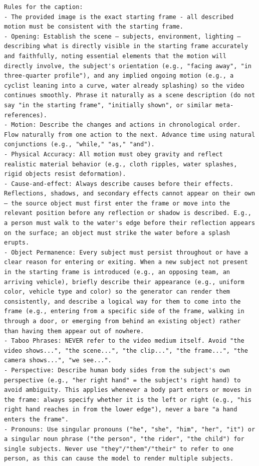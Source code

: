 \documentclass{llmxive}
\begin{document}
\begin{tcolorbox}
\begin{Verbatim}[breaklines=true,breakanywhere=true,fontsize=\scriptsize]
Rules for the caption:
- The provided image is the exact starting frame - all described motion must be consistent with the starting frame.
- Opening: Establish the scene — subjects, environment, lighting — describing what is directly visible in the starting frame accurately and faithfully, noting essential elements that the motion will directly involve, the subject's orientation (e.g., "facing away", "in three-quarter profile"), and any implied ongoing motion (e.g., a cyclist leaning into a curve, water already splashing) so the video continues smoothly. Phrase it naturally as a scene description (do not say "in the starting frame", "initially shown", or similar meta-references).
- Motion: Describe the changes and actions in chronological order. Flow naturally from one action to the next. Advance time using natural conjunctions (e.g., "while," "as," "and").
- Physical Accuracy: All motion must obey gravity and reflect realistic material behavior (e.g., cloth ripples, water splashes, rigid objects resist deformation).
- Cause-and-effect: Always describe causes before their effects. Reflections, shadows, and secondary effects cannot appear on their own — the source object must first enter the frame or move into the relevant position before any reflection or shadow is described. E.g., a person must walk to the water's edge before their reflection appears on the surface; an object must strike the water before a splash erupts.
- Object Permanence: Every subject must persist throughout or have a clear reason for entering or exiting. When a new subject not present in the starting frame is introduced (e.g., an opposing team, an arriving vehicle), briefly describe their appearance (e.g., uniform color, vehicle type and color) so the generator can render them consistently, and describe a logical way for them to come into the frame (e.g., entering from a specific side of the frame, walking in through a door, or emerging from behind an existing object) rather than having them appear out of nowhere.
- Taboo Phrases: NEVER refer to the video medium itself. Avoid "the video shows...", "the scene...", "the clip...", "the frame...", "the camera shows...", "we see...".
- Perspective: Describe human body sides from the subject's own perspective (e.g., "her right hand" = the subject's right hand) to avoid ambiguity. This applies whenever a body part enters or moves in the frame: always specify whether it is the left or right (e.g., "his right hand reaches in from the lower edge"), never a bare "a hand enters the frame".
- Pronouns: Use singular pronouns ("he", "she", "him", "her", "it") or a singular noun phrase ("the person", "the rider", "the child") for single subjects. Never use "they"/"them"/"their" to refer to one person, as this can cause the model to render multiple subjects.

\end{Verbatim}
\end{tcolorbox}
\end{document}
